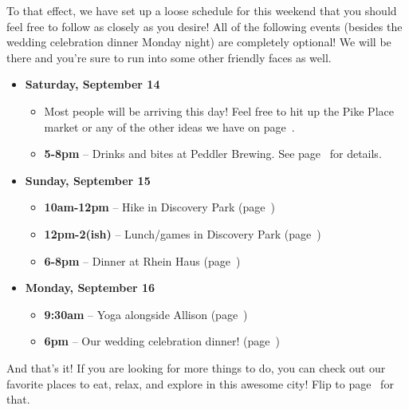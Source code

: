 \documentclass[10pt]{article}
\begin{document}
To that effect, we have set up a loose schedule for this weekend that you should 
feel free to follow as closely as you desire! All of the following events
(besides the wedding celebration dinner Monday night) are completely optional! We will be there
and you're sure to run into some other friendly faces as well.

\begin{itemize}[leftmargin=0.25em]
    \item \textbf{Saturday, September 14}
    \begin{itemize}[leftmargin=1em]
        \item Most people will be arriving this day! Feel free to hit up the Pike Place market or 
        any of the other ideas we have on page~\pageref{sec-things-to-do}.
        \item \textbf{5-8pm} -- Drinks and bites at Peddler Brewing. See page~\pageref{subsec-dinner-sat} for details.
    \end{itemize}
    \item \textbf{Sunday, September 15}
    \begin{itemize}[leftmargin=1em]
        \item \textbf{10am-12pm} -- Hike in Discovery Park (page~\pageref{subsec-discovery})
        \item \textbf{12pm-2(ish)} -- Lunch/games in Discovery Park (page~\pageref{subsec-discovery})
        \item \textbf{6-8pm} -- Dinner at Rhein Haus (page~\pageref{subsec-rheinhaus})
    \end{itemize}
    \item \textbf{Monday, September 16}
    \begin{itemize}[leftmargin=1em]
        \item \textbf{9:30am} -- Yoga alongside Allison (page~\pageref{subsec-yoga})
        \item \textbf{6pm} -- Our wedding celebration dinner! (page~\pageref{subsec-wedding})
    \end{itemize}
\end{itemize}

And that's it! If you are looking for more things to do, you can check out our favorite 
places to eat, relax, and explore in this awesome city! Flip to page~\pageref{sec-things-to-do} for that.


\newpage
\tableofcontents
\end{document}
